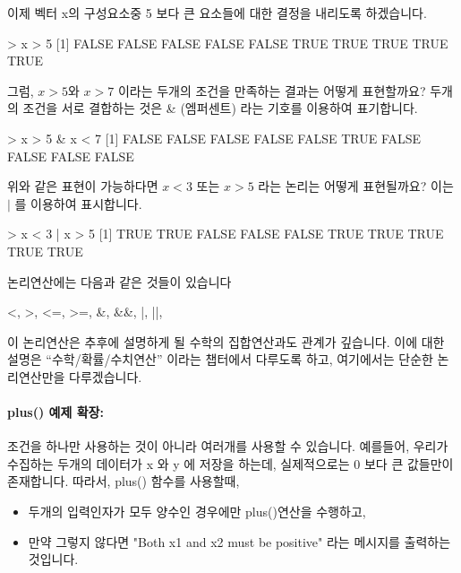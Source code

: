 이제 벡터 x의 구성요소중 5 보다 큰 요소들에 대한 결정을 내리도록 하겠습니다. 

\begin{Schunk}
\begin{Soutput}
> x > 5
 [1] FALSE FALSE FALSE FALSE FALSE  TRUE  TRUE  TRUE  TRUE  TRUE
\end{Soutput}
\end{Schunk}

그럼, $x>5$와  $x>7$ 이라는 두개의 조건을 만족하는 결과는 어떻게 표현할까요?
두개의 조건을 서로 결합하는 것은 \& (엠퍼센트) 라는 기호를 이용하여 표기합니다. 
 
\begin{Schunk}
\begin{Soutput}
> x > 5 & x < 7
 [1] FALSE FALSE FALSE FALSE FALSE  TRUE FALSE FALSE FALSE FALSE
\end{Soutput}
\end{Schunk}

위와 같은 표현이 가능하다면 $x<3$ 또는 $x>5$ 라는 논리는 어떻게 표현될까요? 
이는 $|$ 를 이용하여 표시합니다. 

\begin{Schunk}
\begin{Soutput}
> x < 3 | x > 5
 [1]  TRUE  TRUE FALSE FALSE FALSE  TRUE  TRUE  TRUE  TRUE  TRUE
\end{Soutput}
\end{Schunk}

논리연산에는 다음과 같은 것들이 있습니다
\begin{Schunk}
\begin{Soutput}
<, >, <=, >=, &, &&, |, ||, 
\end{Soutput}
\end{Schunk}

이 논리연산은 추후에 설명하게 될 수학의 집합연산과도 관계가 깊습니다. 
이에 대한 설명은 ``수학/확률/수치연산'' 이라는 챕터에서 다루도록 하고, 여기에서는 단순한 논리연산만을 다루겠습니다. 

\paragraph{plus() 예제 확장: }

조건을 하나만 사용하는 것이 아니라 여러개를 사용할 수 있습니다. 
예를들어, 우리가 수집하는 두개의 데이터가 x 와  y 에 저장을 하는데, 실제적으로는 0 보다 큰 값들만이 존재합니다. 
따라서, plus() 함수를 사용할때,  

\begin{itemize}
\item 두개의 입력인자가 모두 양수인 경우에만 plus()연산을 수행하고,
\item 만약 그렇지 않다면 "Both x1 and x2 must be positive" 라는 메시지를 출력하는 것입니다.
\end{itemize}

